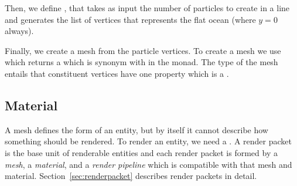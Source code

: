 Then, we define , that takes as input the number of particles to
create in a line and generates the list of vertices that represents the flat
ocean (where $y=0$ always).
\resethooks


Finally, we create a mesh from the particle vertices. To create a mesh we use
 which returns a  which is synonym with  in the  monad. The type of the mesh entails that constituent
vertices have one property which is a .

\resethooks

\subsection{Material}

A mesh defines the form of an entity, but by itself it cannot describe how
something should be rendered. To render an entity, we need a . A
render packet is the base unit of renderable entities and each render packet is
formed by a \emph{mesh}, a \emph{material}, and a \emph{render pipeline} which
is compatible with that mesh and material. Section~\ref{sec:renderpacket}
describes render packets in detail.

